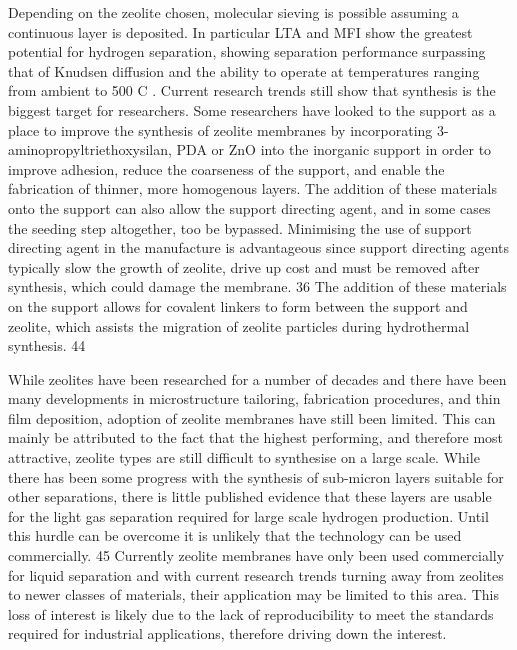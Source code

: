 Depending on the zeolite chosen, molecular sieving is possible assuming a continuous layer is 
deposited. In particular LTA \cite{Huang2013} and MFI \cite{Huang2011} show the greatest potential for hydrogen separation, 
showing separation performance surpassing that of Knudsen diffusion \cite{Huang2010, Wang2014} and the ability to 
operate at temperatures ranging from ambient \cite{Huang2010} to 500 \textdegree C \cite{Wang2014}. Current research 
trends still show that synthesis is the biggest target for researchers.  Some researchers 
have looked to 
the support as a place to improve the synthesis of zeolite membranes by incorporating 
3-aminopropyltriethoxysilan, PDA or ZnO into the inorganic support in order to improve 
adhesion, reduce the coarseness of the support, and enable the fabrication of thinner, 
more homogenous layers. The addition of these materials onto the support can also allow the 
support directing agent, and in some cases the seeding step altogether, too be bypassed. 
Minimising the use of support directing agent in the manufacture is advantageous since 
support directing agents typically slow the growth of zeolite, drive up cost and must be 
removed after synthesis, which could damage the membrane. 36 The addition of these materials 
on the support allows for covalent linkers to form between the support and zeolite, which 
assists the migration of zeolite particles during hydrothermal synthesis. 44

While zeolites have been researched for a number of decades and there have been many 
developments in microstructure tailoring, fabrication procedures, and thin film deposition, 
adoption of zeolite membranes have still been limited. This can mainly be attributed to the 
fact that the highest performing, and therefore most attractive, zeolite types are still 
difficult to synthesise on a large scale. While there has been some progress with the 
synthesis of sub-micron layers suitable for other separations, there is little published 
evidence that these layers are usable for the light gas separation required for large scale 
hydrogen production. Until this hurdle can be overcome it is unlikely that the technology 
can be used commercially. 45 Currently zeolite membranes have only been used commercially 
for liquid separation and with current research trends turning away from zeolites to newer 
classes of materials, their application may be limited to this area. This loss of interest 
is likely due to the lack of reproducibility to meet the standards required for industrial 
applications, therefore driving down the interest. 


